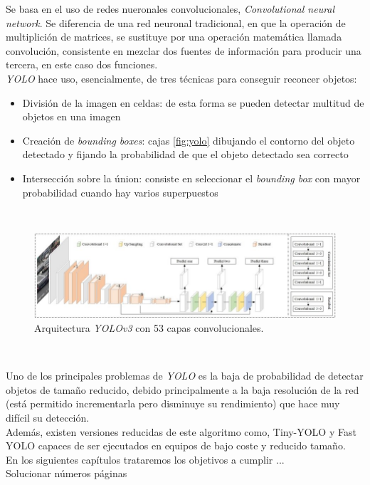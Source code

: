 Se basa en el uso de redes nueronales convolucionales, \textit{Convolutional neural network}. Se diferencia de una red neuronal tradicional, en que la operación de multiplición de matrices, se sustituye por una operación matemática llamada convolución, consistente en mezclar dos fuentes de información para producir una tercera, en este caso dos funciones.\\


\textit{YOLO} hace uso, esencialmente, de tres técnicas para conseguir reconcer objetos:
\begin{itemize}
	\item División de la imagen en celdas: de esta forma se pueden detectar multitud de objetos en una imagen
	\item Creación de \textit{bounding boxes}: cajas \ref{fig:yolo} dibujando el contorno del objeto detectado y fijando la probabilidad de que el objeto detectado sea correcto
	\item Intersección sobre la únion: consiste en seleccionar el \textit{bounding box} con mayor probabilidad cuando hay varios superpuestos
\end{itemize}\


\begin{figure} [h!]
	\begin{center}
		\includegraphics[width=16cm]{figs/yolov353}
	\end{center}
	\caption{Arquitectura \textit{YOLOv3} con 53 capas convolucionales.}
	\label{fig:yololayers}
\end{figure}\

Uno de los principales problemas de \textit{YOLO} es la baja de probabilidad de detectar objetos de tamaño reducido, debido principalmente a la baja resolución de la red (está permitido incrementarla pero disminuye su rendimiento) que hace muy difícil su detección.\\

Además, existen versiones reducidas de este algoritmo como, Tiny-YOLO y Fast YOLO capaces de ser ejecutados en equipos de bajo coste y reducido tamaño.\\

En los siguientes capítulos trataremos los objetivos a cumplir ...\\
Solucionar números páginas